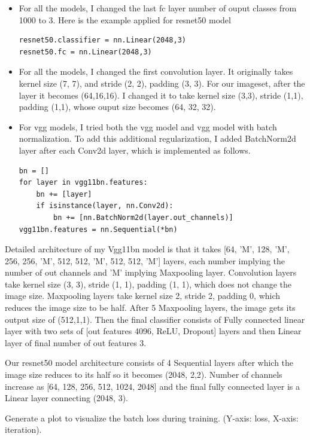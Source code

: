 \documentclass[11pt]{article}
\newcommand{\0}{{\mathbf{0}}}
\newcommand{\1}{{\mathbf{1}}}
\newcommand{\pr}[1]{\noindent{\bf #1.}}
\begin{document}
\begin{itemize}
\item For all the models, I changed the last fc layer number of ouput classes from 1000 to 3. Here is the example applied for resnet50 model
\begin{verbatim}
resnet50.classifier = nn.Linear(2048,3)
resnet50.fc = nn.Linear(2048,3)
\end{verbatim}
\item For all the models, I changed the first convolution layer. It originally takes kernel size (7, 7), and stride (2, 2), padding (3, 3). For our imageset, after the layer it becomes (64,16,16). I changed it to take kernel size (3,3), stride (1,1), padding (1,1), whose ouput size becomes (64, 32, 32).
\item For vgg models, I tried both the vgg model and vgg model with batch normalization. To add this additional regularization, I added BatchNorm2d layer after each Conv2d layer, which is implemented as follows.
\begin{verbatim}
bn = []
for layer in vgg11bn.features:
    bn += [layer]
    if isinstance(layer, nn.Conv2d):
        bn += [nn.BatchNorm2d(layer.out_channels)]
vgg11bn.features = nn.Sequential(*bn)
\end{verbatim}
\end{itemize} 

Detailed architecture of my Vgg11bn model is that it takes [64, 'M', 128, 'M', 256, 256, 'M', 512, 512, 'M', 512, 512, 'M'] layers, each number implying the number of out channels and 'M' implying Maxpooling layer. Convolution layers take kernel size (3, 3), stride (1, 1), padding (1, 1), which does not change the image size. Maxpooling layers take kernel size 2, stride 2, padding 0, which reduces the image size to be half. After 5 Maxpooling layers, the image gets its output size of (512,1,1). Then the final classifier consists of Fully connected linear layer with two sets of [out features 4096, ReLU, Dropout] layers and then Linear layer of final number of out features 3.

Our resnet50 model architecture consists of 4 Sequential layers after which the image size reduces to its half so it becomes (2048, 2,2). Number of channels increase as [64, 128, 256, 512, 1024, 2048] and the final fully connected layer is a Linear layer connecting (2048, 3).




\pr{2} Generate a plot to visualize the batch loss during training. (Y-axis: loss, X-axis: iteration). 
\end{document}
